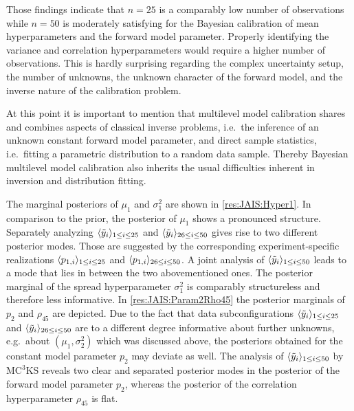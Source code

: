Those findings indicate that \(n=25\) is a comparably low number of observations while \(n=50\) is moderately satisfying for the Bayesian calibration of mean hyperparameters and the forward model parameter.
Properly identifying the variance and correlation hyperparameters would require a higher number of observations.
This is hardly surprising regarding the complex uncertainty setup, the number of unknowns, the unknown character of the forward model, and the inverse nature of the calibration problem.
\par %
At this point it is important to mention that multilevel model calibration shares and combines aspects of classical inverse problems,
i.e.\ the inference of an unknown constant forward model parameter, and direct sample statistics, i.e.\ fitting a parametric distribution to a random data sample.
Thereby Bayesian multilevel model calibration also inherits the usual difficulties inherent in inversion and distribution fitting.
\par %
The marginal posteriors of \(\mu_1\) and \(\sigma^2_1\) are shown in \cref{res:JAIS:Hyper1}.
In comparison to the prior, the posterior of \(\mu_1\) shows a pronounced structure.
Separately analyzing \(\langle{\tilde{y}_i}\rangle_{1 \leq i \leq 25}\) and \(\langle{\tilde{y}_i}\rangle_{26 \leq i \leq 50}\) gives rise to two different posterior modes.
Those are suggested by the corresponding experiment-specific realizations \(\langle{p_{1,i}}\rangle_{1 \leq i \leq 25}\) and \(\langle{p_{1,i}}\rangle_{26 \leq i \leq 50}\).
A joint analysis of \(\langle{\tilde{y}_i}\rangle_{1 \leq i \leq 50}\) leads to a mode that lies in between the two abovementioned ones.
The posterior marginal of the spread hyperparameter \(\sigma^2_1\) is comparably structureless and therefore less informative.
In \cref{res:JAIS:Param2Rho45} the posterior marginals of \(p_2\) and \(\rho_{45}\) are depicted.
Due to the fact that data subconfigurations \(\langle{\tilde{y}_i}\rangle_{1 \leq i \leq 25}\) and \(\langle{\tilde{y}_i}\rangle_{26 \leq i \leq 50}\)
are to a different degree informative about further unknowns, e.g.\ about \((\mu_1,\sigma^2_2)\) which was discussed above, the posteriors obtained for the constant model parameter \(p_2\) may deviate as well.
The analysis of \(\langle{\tilde{y}_i}\rangle_{1 \leq i \leq 50}\) by \(\text{MC}^3\text{KS}\) reveals two clear and separated posterior modes in the posterior of the forward model parameter \(p_2\),
whereas the posterior of the correlation hyperparameter \(\rho_{45}\) is flat.
